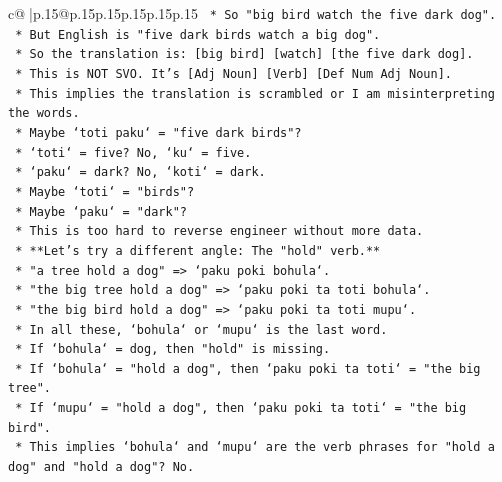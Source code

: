 \documentclass{article}
\begin{document}
{\begin{supertabular}{c@{$\;$}|p{.15\linewidth}@{}p{.15\linewidth}p{.15\linewidth}p{.15\linewidth}p{.15\linewidth}p{.15\linewidth}}
{{{\texttt{                        *   So "big bird watch the five dark dog".} \\
\texttt{                        *   But English is "five dark birds watch a big dog".} \\
\texttt{                        *   So the translation is: {[}big bird{]} {[}watch{]} {[}the five dark dog{]}.} \\
\texttt{                        *   This is NOT SVO. It's {[}Adj Noun{]} {[}Verb{]} {[}Def Num Adj Noun{]}.} \\
\texttt{                        *   This implies the translation is scrambled or I am misinterpreting the words.} \\
\texttt{                        *   Maybe `toti paku` = "five dark birds"?} \\
\texttt{                            *   `toti` = five? No, `ku` = five.} \\
\texttt{                            *   `paku` = dark? No, `koti` = dark.} \\
\texttt{                        *   Maybe `toti` = "birds"?} \\
\texttt{                        *   Maybe `paku` = "dark"?} \\
\texttt{                        *   This is too hard to reverse engineer without more data.} \\
\texttt{                *   **Let's try a different angle: The "hold" verb.**} \\
\texttt{                    *   "a tree hold a dog" => `paku poki bohula`.} \\
\texttt{                    *   "the big tree hold a dog" => `paku poki ta toti bohula`.} \\
\texttt{                    *   "the big bird hold a dog" => `paku poki ta toti mupu`.} \\
\texttt{                    *   In all these, `bohula` or `mupu` is the last word.} \\
\texttt{                    *   If `bohula` = dog, then "hold" is missing.} \\
\texttt{                    *   If `bohula` = "hold a dog", then `paku poki ta toti` = "the big tree".} \\
\texttt{                    *   If `mupu` = "hold a dog", then `paku poki ta toti` = "the big bird".} \\
\texttt{                    *   This implies `bohula` and `mupu` are the verb phrases for "hold a dog" and "hold a dog"? No.} \\
}}}
\end{supertabular}}
\end{document}
